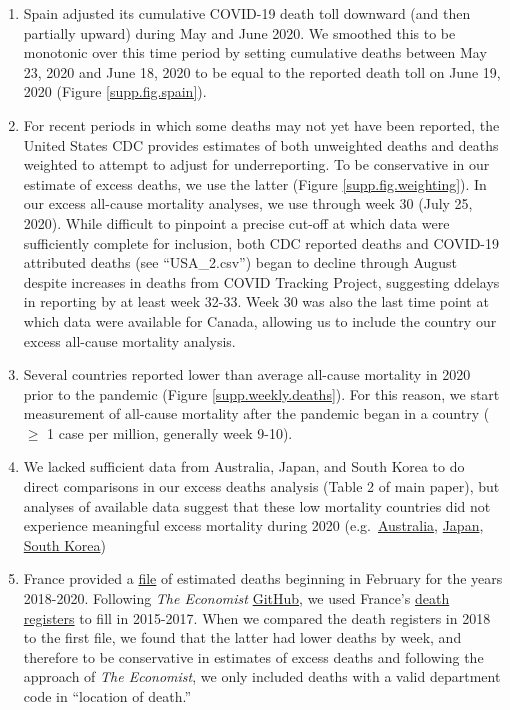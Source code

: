 \documentclass[
]{article}
\providecommand{\tightlist}{%
  \setlength{\itemsep}{0pt}\setlength{\parskip}{0pt}}
\begin{document}
\begin{enumerate}
\def\labelenumi{\arabic{enumi}.}
\tightlist
\item
  Spain adjusted its cumulative COVID-19 death toll downward (and then
  partially upward) during May and June 2020. We smoothed this to be
  monotonic over this time period by setting cumulative deaths between
  May 23, 2020 and June 18, 2020 to be equal to the reported death toll
  on June 19, 2020 (Figure \ref{supp.fig.spain}).
\item
  For recent periods in which some deaths may not yet have been
  reported, the United States CDC provides estimates of both unweighted
  deaths and deaths weighted to attempt to adjust for underreporting. To
  be conservative in our estimate of excess deaths, we use the latter
  (Figure \ref{supp.fig.weighting}). In our excess all-cause mortality
  analyses, we use through week 30 (July 25, 2020). While difficult to
  pinpoint a precise cut-off at which data were sufficiently complete
  for inclusion, both CDC reported deaths and COVID-19 attributed deaths
  (see ``USA\_2.csv'') began to decline through August despite increases
  in deaths from COVID Tracking Project, suggesting ddelays in reporting
  by at least week 32-33. Week 30 was also the last time point at which
  data were available for Canada, allowing us to include the country our
  excess all-cause mortality analysis.
\item
  Several countries reported lower than average all-cause mortality in
  2020 prior to the pandemic (Figure \ref{supp.weekly.deaths}). For this
  reason, we start measurement of all-cause mortality after the pandemic
  began in a country (\(\geq\) 1 case per million, generally week 9-10).
\item
  We lacked sufficient data from Australia, Japan, and South Korea to do
  direct comparisons in our excess deaths analysis (Table 2 of main
  paper), but analyses of available data suggest that these low
  mortality countries did not experience meaningful excess mortality
  during 2020
  (e.g.~\href{https://www.abc.net.au/news/2020-06-23/coronavirus-australia-excess-deaths-data-analysis/12321162}{Australia},
  \href{https://www.bloomberg.com/news/articles/2020-07-29/japan-dodged-surge-in-total-fatalities-during-peak-virus-month}{Japan},
  \href{https://www.nytimes.com/interactive/2020/04/21/world/coronavirus-missing-deaths.html}{South Korea})
\item
  France provided a
  \href{https://www.insee.fr/fr/statistiques/4487988?sommaire=4487854}{file}
  of estimated deaths beginning in February for the years 2018-2020.
  Following \emph{The Economist}
  \href{https://github.com/TheEconomist/covid-19-excess-deaths-tracker}{GitHub},
  we used France's
  \href{https://www.insee.fr/fr/information/4190491}{death registers} to
  fill in 2015-2017. When we compared the death registers in 2018 to the
  first file, we found that the latter had lower deaths by week, and
  therefore to be conservative in estimates of excess deaths and
  following the approach of \emph{The Economist}, we only included
  deaths with a valid department code in ``location of death.''
\end{enumerate}
\end{document}
